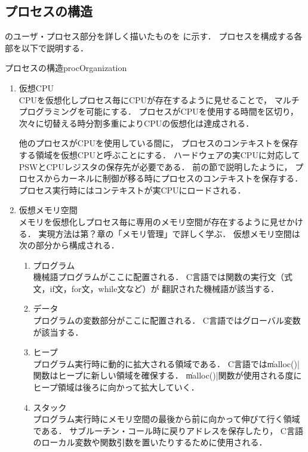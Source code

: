 \subsection{プロセスの構造}
のユーザ・プロセス部分を詳しく描いたものを
に示す．
プロセスを構成する各部を以下で説明する．

{プロセスの構造}{procOrganization}

\begin{enumerate}
\item 仮想CPU \\
CPUを仮想化しプロセス毎にCPUが存在するように見せることで，
マルチプログラミングを可能にする．
プロセスがCPUを使用する時間を区切り，
次々に切替える時分割多重によりCPUの仮想化は達成される．

他のプロセスがCPUを使用している間に，
プロセスのコンテキストを保存する領域を仮想CPUと呼ぶことにする．
ハードウェアの実CPUに対応してPSWとCPUレジスタの保存先が必要である．
前の節で説明したように，
プロセスからカーネルに制御が移る時にプロセスのコンテキストを保存する．
プロセス実行時にはコンテキストが実CPUにロードされる．

\item 仮想メモリ空間 \\
メモリを仮想化しプロセス毎に専用のメモリ空間が存在するように見せかける．
実現方法は第？章の「メモリ管理」で詳しく学ぶ．
仮想メモリ空間は次の部分から構成される．

\begin{enumerate}
\item プログラム \\
機械語プログラムがここに配置される．
C言語では関数の実行文（式文，if文，for文，while文など）が
翻訳された機械語が該当する．

\item データ \\
プログラムの変数部分がここに配置される．
C言語ではグローバル変数が該当する．

\item ヒープ \\
プログラム実行時に動的に拡大される領域である．
C言語では\|malloc()|関数はヒープに新しい領域を確保する．
\|malloc()|関数が使用される度にヒープ領域は後ろに向かって拡大していく．

\item スタック \\
プログラム実行時にメモリ空間の最後から前に向かって伸びて行く領域である．
サブルーチン・コール時に戻りアドレスを保存したり，
C言語のローカル変数や関数引数を置いたりするために使用される．


\end{enumerate}
\end{enumerate}
